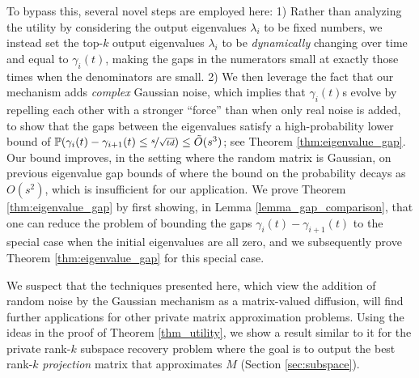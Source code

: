 \documentclass[11pt,letterpaper]{article}
\newcommand{\nfrac}{\nicefrac}
\begin{document}
To bypass this,  several novel steps are employed here:
%
1) Rather than analyzing the utility by considering the output eigenvalues $\lambda_i$ to be fixed numbers, we instead set the top-$k$ output eigenvalues $\lambda_i$ to be {\em dynamically} changing over time and equal to $\gamma_i(t)$, making the gaps in the numerators small at exactly those times when the denominators are small.
%
2) We then leverage the fact that our mechanism adds {\em complex} Gaussian noise, which implies that $\gamma_i(t)$s evolve by repelling each other with a stronger ``force'' than when only real noise is added, to show that the gaps between the eigenvalues satisfy a high-probability lower bound of $\mathbb{P}(\gamma_i(t) - \gamma_{i+1}(t) \leq  \nfrac{s}{\sqrt{td}}) \leq \tilde{O}(s^3)$;  see Theorem 
\ref{thm:eigenvalue_gap}.
Our bound improves, in the setting where the random matrix is Gaussian, on previous eigenvalue gap bounds of \cite{nguyen2017random} where the bound on the probability decays as $O(s^2)$, which is insufficient for our application.
%
%
We prove Theorem \ref{thm:eigenvalue_gap}  by first showing, in Lemma \ref{lemma_gap_comparison}, that one can reduce the problem of bounding the gaps $\gamma_i(t)-\gamma_{i+1}(t)$ to the special case when the initial eigenvalues are all zero, and we subsequently prove Theorem \ref{thm:eigenvalue_gap} for this special case. 

 We suspect that the techniques presented here, which view the addition of random noise by the Gaussian mechanism as a matrix-valued diffusion, will find further applications for other private matrix approximation problems.
%
Using the ideas in the proof of Theorem \ref{thm_utility},
 we show a result similar to it for the private rank-$k$ subspace recovery problem where the goal is to output the best rank-$k$ {\em projection} matrix that approximates $M$ (Section \ref{sec:subspace}).
\end{document}
